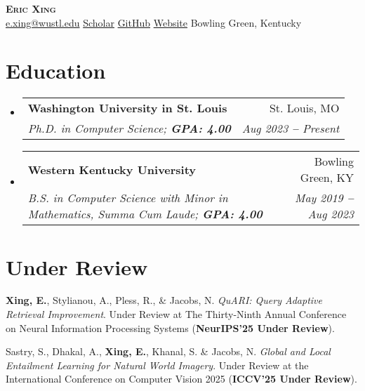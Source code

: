 \documentclass[letterpaper,11pt]{article}
\makeatletter
\newcommand{\resumeEducationHeading}[4]{
  \vspace{-2pt}\item
    \begin{tabular*}{0.97\textwidth}[t]{l@{\extracolsep{\fill}}r}
      \textbf{#1} & #2 \\
      \textit{\small#3} & \textit{\small #4} \\
    \end{tabular*}\vspace{-5pt}
}
\newcommand{\resumeSubHeadingListStart}{\begin{itemize}[leftmargin=0.15in, label={}]}
\newcommand{\resumeSubHeadingListEnd}{\end{itemize}}
\newcommand{\pubnolink}[1]{\item {#1}\vspace{-5pt}}
\makeatother
\begin{document}

\begin{center}
    \textbf{\Huge \scshape Eric Xing} \\ \vspace{3pt}
    \small
    \faEnvelopeO \hspace{.5pt} \href{mailto:e.xing@wustl.edu}{e.xing@wustl.edu}
    \textbf{\textbar}
    \aiGoogleScholar  \hspace{.5pt} \href{https://scholar.google.com/citations?user=a-RC9VkAAAAJ&hl=en}{Scholar}
    \textbf{\textbar}
    \faGithub \hspace{.5pt} \href{https://github.com/EricX003}{GitHub}
    \textbf{\textbar}
     \ComputerMouse \hspace{.5pt}\href{https://EricX003.github.io}{Website}
    \textbf{\textbar} 
    \faGlobe \hspace{.5pt} Bowling Green, Kentucky
    
\end{center}


\section{Education}
  \vspace{3pt}
  \resumeSubHeadingListStart
    
    \resumeEducationHeading
      {Washington University in St. Louis}{St. Louis, MO}
      {Ph.D. in Computer Science; \textbf{GPA: 4.00}}{Aug 2023 \textbf{--} Present}
    \resumeEducationHeading
      {Western Kentucky University}{Bowling Green, KY}
      {B.S. in Computer Science with Minor in Mathematics, Summa Cum Laude; \textbf{GPA: 4.00}}{May 2019 \textbf{--} Aug 2023}
    
  \resumeSubHeadingListEnd

\section{Under Review}
\begin{enumerate}[start=1,label={[\arabic*]}\parindent-0.2\labelwidth\relax]
    \pubnolink{\textbf{Xing, E.}, Stylianou, A., Pless, R., \& Jacobs, N. \textit{QuARI: Query Adaptive Retrieval Improvement}. Under Review at The Thirty-Ninth Annual Conference on Neural Information Processing Systems (\textbf{NeurIPS'25 Under Review}).}{}
    
    \pubnolink{Sastry, S., Dhakal, A., \textbf{Xing, E.}, Khanal, S. \& Jacobs, N. \textit{Global and Local Entailment Learning for Natural World Imagery}. Under Review at the International Conference on Computer Vision 2025 (\textbf{ICCV'25 Under Review}).}{}
    
  \end{enumerate}
\end{document}
